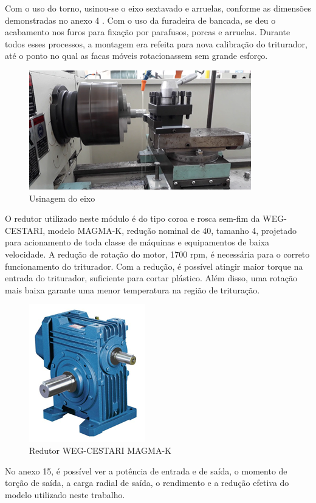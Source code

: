 Com o uso do torno, usinou-se o eixo sextavado e arruelas, conforme as dimensões demonstradas no anexo 4 . Com o uso da furadeira de bancada, se deu o acabamento nos furos para fixação por parafusos, porcas e arruelas. Durante todos esses processos, a montagem era refeita para nova calibração do triturador, até o ponto no qual as facas móveis rotacionassem sem grande esforço.

\begin{figure}[!h]
	\centering
		\includegraphics[scale=0.7]{figuras/estrutura/15.png}
	\caption{Usinagem do eixo}
\end{figure}

O redutor utilizado neste módulo é do tipo coroa e rosca sem-fim da WEG-CESTARI, modelo MAGMA-K, redução nominal de 40, tamanho 4, projetado para acionamento de toda classe de máquinas e equipamentos de baixa velocidade. A redução de rotação do motor, 1700 rpm, é necessária para o correto funcionamento do triturador. Com a redução, é possível atingir maior torque na entrada do triturador, suficiente para cortar plástico. Além disso, uma rotação mais baixa garante uma menor temperatura na região de trituração. 

\begin{figure}[!h]
	\centering
		\includegraphics[scale=0.6]{figuras/estrutura/16.png}
	\caption{Redutor WEG-CESTARI MAGMA-K}
\end{figure}

No anexo 15, é possível ver a potência de entrada e de saída, o momento de torção de saída, a carga radial de saída, o rendimento e a redução efetiva do modelo utilizado neste trabalho.

